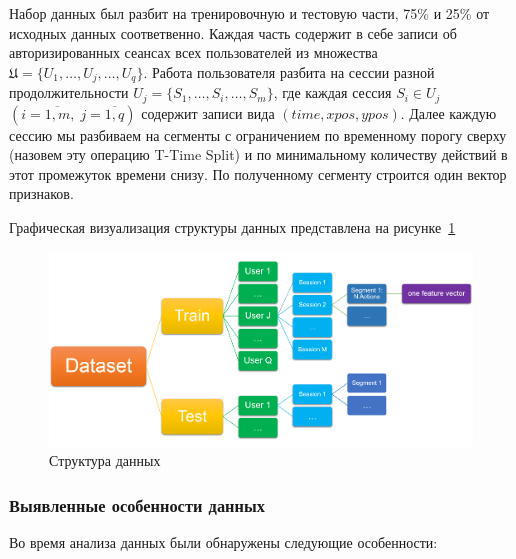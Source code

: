 \documentclass[12pt]{article}
\begin{document}
    \par Набор данных был разбит на тренировочную и тестовую части, 75\% и 25\% от исходных данных соответвенно. Каждая часть содержит в себе записи об авторизированных сеансах всех пользователей из множества $\mathfrak{U}=\{U_1, \ldots, U_j, \ldots, U_q\}$. Работа пользователя разбита на сессии разной продолжительности $U_j = \{S_1, \ldots, S_i, \ldots, S_m\}$, где каждая сессия $S_i \in U_j$ $(i = \overline{1,m}, \; j = \overline{1,q})$ содержит записи вида $(time, xpos, ypos)$. Далее каждую сессию мы разбиваем на сегменты с ограничением по временному порогу сверху (назовем эту операцию T-Time Split) и по минимальному количеству действий в этот промежуток времени снизу. По полученному сегменту строится один вектор признаков.

    \par Графическая визуализация структуры данных представлена на рисунке~\ref{sec:Research:Data:Description:fig:DataStructure}

    \vspace{10mm}
    \begin{figure}[h!]
        \centering
        \includegraphics[width=\linewidth]{DataStructure.png}
        \caption{Структура данных}
        \label{sec:Research:Data:Description:fig:DataStructure}
    \end{figure}
    \vspace{5mm}


    \subsubsection{Выявленные особенности данных}
    \label{sec:Research:Data:Features}

    \par Во время анализа данных были обнаружены следующие особенности:
\end{document}
